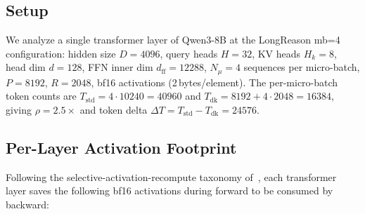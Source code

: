\documentclass{article}
\begin{document}
\subsection{Setup}

We analyze a single transformer layer of Qwen3-8B at the LongReason mb=4 configuration: hidden size $D{=}4096$, query heads $H{=}32$, KV heads $H_k{=}8$, head dim $d{=}128$, FFN inner dim $d_{\text{ff}}{=}12288$, $N_\mu{=}4$ sequences per micro-batch, $P{=}8192$, $R{=}2048$, bf16 activations (2\,bytes/element). The per-micro-batch token counts are $T_{\text{std}} = 4 \cdot 10240 = 40960$ and $T_{\text{dk}} = 8192 + 4 \cdot 2048 = 16384$, giving $\rho = 2.5\times$ and token delta $\Delta T = T_{\text{std}} - T_{\text{dk}} = 24576$.

\subsection{Per-Layer Activation Footprint}

Following the selective-activation-recompute taxonomy of~\citet{korthikanti2023reducing}, each transformer layer saves the following bf16 activations during forward to be consumed by backward:
\end{document}
